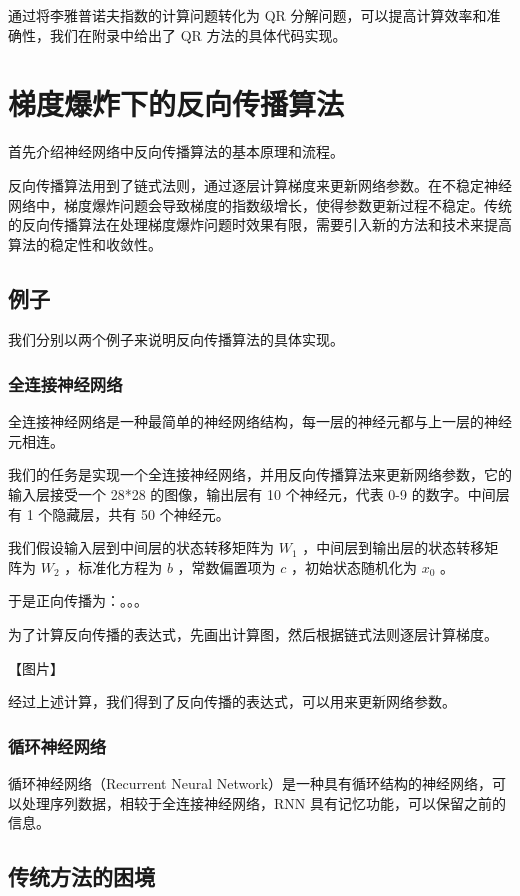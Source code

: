 \documentclass[12pt,a4paper]{amsart}
\begin{document}
通过将李雅普诺夫指数的计算问题转化为 QR 分解问题，可以提高计算效率和准确性，我们在附录中给出了 QR 方法的具体代码实现。

\section{梯度爆炸下的反向传播算法}

首先介绍神经网络中反向传播算法的基本原理和流程。

反向传播算法用到了链式法则，通过逐层计算梯度来更新网络参数。在不稳定神经网络中，梯度爆炸问题会导致梯度的指数级增长，使得参数更新过程不稳定。传统的反向传播算法在处理梯度爆炸问题时效果有限，需要引入新的方法和技术来提高算法的稳定性和收敛性。

\subsection{例子}

我们分别以两个例子来说明反向传播算法的具体实现。

\subsubsection{全连接神经网络}

全连接神经网络是一种最简单的神经网络结构，每一层的神经元都与上一层的神经元相连。

我们的任务是实现一个全连接神经网络，并用反向传播算法来更新网络参数，它的输入层接受一个 28*28 的图像，输出层有 10 个神经元，代表 0-9 的数字。中间层有 1 个隐藏层，共有 50 个神经元。

我们假设输入层到中间层的状态转移矩阵为 $W_1$ ，中间层到输出层的状态转移矩阵为 $W_2$ ，标准化方程为 $b$ ，常数偏置项为 $c$ ，初始状态随机化为 $x_0$ 。

于是正向传播为：。。。

为了计算反向传播的表达式，先画出计算图，然后根据链式法则逐层计算梯度。

【图片】

经过上述计算，我们得到了反向传播的表达式，可以用来更新网络参数。

\subsubsection{循环神经网络}

循环神经网络（Recurrent Neural Network）是一种具有循环结构的神经网络，可以处理序列数据，相较于全连接神经网络，RNN 具有记忆功能，可以保留之前的信息。

\subsection{传统方法的困境}
\end{document}
